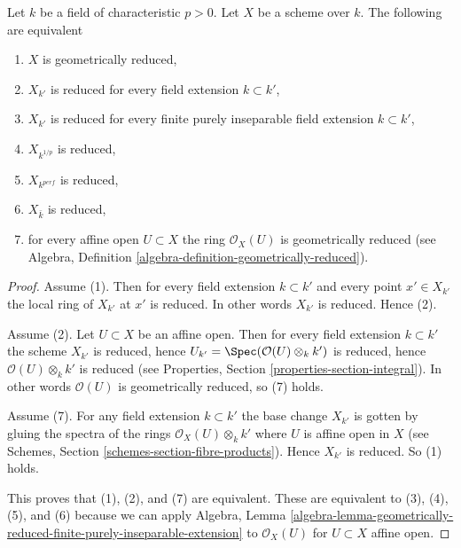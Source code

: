 \begin{lemma}
\label{lemma-geometrically-reduced}
Let $k$ be a field of characteristic $p > 0$. Let $X$ be a scheme over $k$.
The following are equivalent
\begin{enumerate}
\item $X$ is geometrically reduced,
\item $X_{k'}$ is reduced for every field extension $k \subset k'$,
\item $X_{k'}$ is reduced for every finite purely inseparable field extension
$k \subset k'$,
\item $X_{k^{1/p}}$ is reduced,
\item $X_{k^{perf}}$ is reduced,
\item $X_{\bar k}$ is reduced,
\item for every affine open $U \subset X$ the ring $\mathcal{O}_X(U)$
is geometrically reduced (see
Algebra, Definition \ref{algebra-definition-geometrically-reduced}).
\end{enumerate}
\end{lemma}

\begin{proof}
Assume (1). Then for every field extension $k \subset k'$ and
every point $x' \in X_{k'}$ the local ring of $X_{k'}$ at $x'$
is reduced. In other words $X_{k'}$ is reduced. Hence (2).

\medskip\noindent
Assume (2). Let $U \subset X$ be an affine open. Then for
every field extension $k \subset k'$ the scheme $X_{k'}$ is reduced, hence
$U_{k'} = \Spec(\mathcal{O}(U)\otimes_k k')$ is reduced,
hence $\mathcal{O}(U)\otimes_k k'$ is reduced (see Properties,
Section \ref{properties-section-integral}). In other words
$\mathcal{O}(U)$ is geometrically reduced, so (7) holds.

\medskip\noindent
Assume (7). For any field extension $k \subset k'$ the base
change $X_{k'}$ is gotten by gluing the spectra of the
rings $\mathcal{O}_X(U) \otimes_k k'$ where $U$ is affine open
in $X$ (see Schemes, Section \ref{schemes-section-fibre-products}).
Hence $X_{k'}$ is reduced. So (1) holds.

\medskip\noindent
This proves that (1), (2), and (7) are equivalent. These are equivalent
to (3), (4), (5), and (6) because we can apply Algebra, Lemma
\ref{algebra-lemma-geometrically-reduced-finite-purely-inseparable-extension}
to $\mathcal{O}_X(U)$ for $U \subset X$ affine open.
\end{proof}

